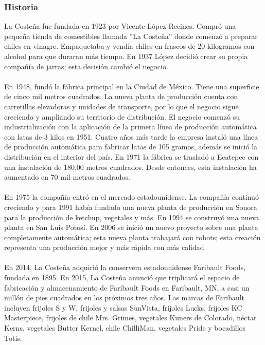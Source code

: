 \documentclass[12pt,letterpaper]{article}
\begin{document}
\subsubsection{Historia}
La Costeña fue fundada en 1923 por Vicente López Recines. Compró una pequeña tienda de comestibles llamada ''La Costeña'' donde 
comenzó a preparar chiles en vinagre. Empaquetaba y vendía chiles en frascos de 20 kilogramos con alcohol para que duraran más 
tiempo. En 1937 López decidió crear su propia compañía de jarras; esta decisión cambió el negocio. 
\\ \\
En 1948, fundó la fábrica principal en la Ciudad de México. Tiene una superficie de cinco mil metros cuadrados. La nueva planta 
de producción cuenta con carretillas elevadoras y unidades de transporte, por lo que el negocio sigue creciendo y ampliando su 
territorio de distribución. El negocio comenzó su industrialización con la aplicación de la primera línea de producción automática 
con latas de 3 kilos en 1951. Cuatro años más tarde la empresa instaló una línea de producción automática para fabricar latas de 
105 gramos, además se inició la distribución en el interior del país. En 1971 la fábrica se trasladó a Ecatepec con una instalación 
de 180,00 metros cuadrados. Desde entonces, esta instalación ha aumentado en 70 mil metros cuadrados.
\\ \\
En 1975 la compañía entró en el mercado estadounidense. La compañía continuó creciendo y para 1991 había fundado una nueva planta 
de producción en Sonora para la producción de ketchup, vegetales y más. En 1994 se construyó una nueva planta en San Luis Potosí. 
En 2006 se inició un nuevo proyecto sobre una planta completamente automática; esta nueva planta trabajará con robots; esta 
creación representa una producción mejor y más rápida con más calidad.
\\ \\ 
En 2014, La Costeña adquirió la conservera estadounidense Faribault Foods, fundada en 1895. En 2015, La Costeña anunció que triplicará 
el espacio de fabricación y almacenamiento de Faribault Foods en Faribault, MN, a casi un millón de pies cuadrados en los próximos tres 
años. Las marcas de Faribault incluyen frijoles S y W, frijoles y salsas SunVista, frijoles Lucks, frijoles KC Masterpiece, frijoles 
de chile Mrs. Grimes, vegetales Kuners de Colorado, néctar Kerns, vegetales Butter Kernel, chile ChilliMan, vegetales Pride y bocadillos Totis.
\end{document}
